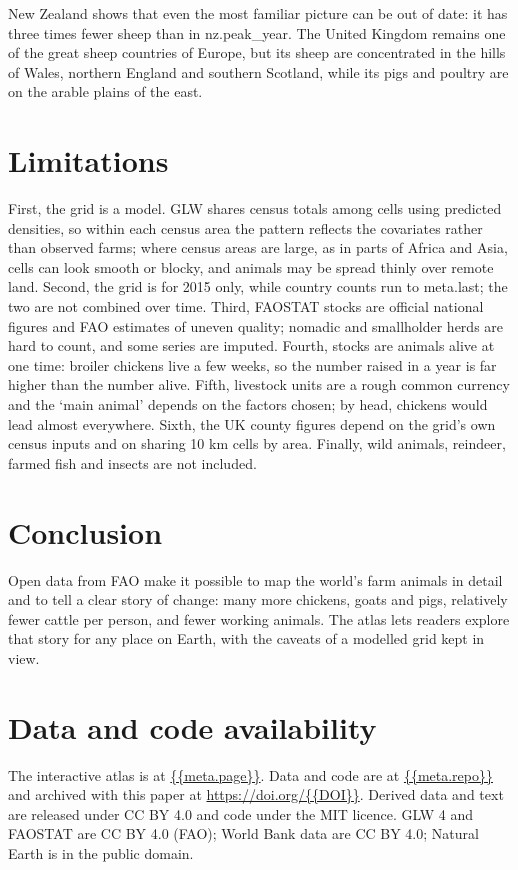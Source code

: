 \documentclass[11pt,a4paper]{article}
\begin{document}
New Zealand shows that even the most familiar picture can be out of date: it has three times fewer sheep than in {{nz.peak_year}}. The United Kingdom remains one of the great sheep countries of Europe, but its sheep are concentrated in the hills of Wales, northern England and southern Scotland, while its pigs and poultry are on the arable plains of the east.

\section{Limitations}
First, the grid is a model. GLW shares census totals among cells using predicted densities, so within each census area the pattern reflects the covariates rather than observed farms; where census areas are large, as in parts of Africa and Asia, cells can look smooth or blocky, and animals may be spread thinly over remote land. Second, the grid is for 2015 only, while country counts run to {{meta.last}}; the two are not combined over time. Third, FAOSTAT stocks are official national figures and FAO estimates of uneven quality; nomadic and smallholder herds are hard to count, and some series are imputed. Fourth, stocks are animals alive at one time: broiler chickens live a few weeks, so the number raised in a year is far higher than the number alive. Fifth, livestock units are a rough common currency and the `main animal' depends on the factors chosen; by head, chickens would lead almost everywhere. Sixth, the UK county figures depend on the grid's own census inputs and on sharing 10 km cells by area. Finally, wild animals, reindeer, farmed fish and insects are not included.

\section{Conclusion}
Open data from FAO make it possible to map the world's farm animals in detail and to tell a clear story of change: many more chickens, goats and pigs, relatively fewer cattle per person, and fewer working animals. The atlas lets readers explore that story for any place on Earth, with the caveats of a modelled grid kept in view.

\section*{Data and code availability}
The interactive atlas is at \url{{{meta.page}}}. Data and code are at \url{{{meta.repo}}} and archived with this paper at \url{https://doi.org/{{DOI}}}. Derived data and text are released under CC BY 4.0 and code under the MIT licence. GLW 4 and FAOSTAT are CC BY 4.0 (FAO); World Bank data are CC BY 4.0; Natural Earth is in the public domain.
\end{document}

